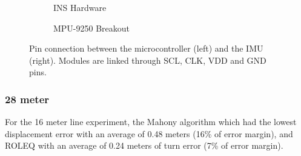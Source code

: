 \begin{figure}[!h]
    \centering
    \begin{subfigure}{0.49\textwidth}
        \centering
        \resizebox{1\linewidth}{!}{}
        \caption{INS Hardware}
        \label{fig:square162D}
    \end{subfigure}
    \begin{subfigure}{0.49\textwidth}
        \centering
        \resizebox{1\linewidth}{!}{}
        \caption{MPU-9250 Breakout}
        \label{fig:square163D}
    \end{subfigure}
    \caption{Pin connection between the microcontroller (left) and the IMU (right). Modules are linked through SCL, CLK, VDD and GND pins.}
    \label{fig:square16}
\end{figure}

\subsubsection{28 meter}

For the 16 meter line experiment, the Mahony algorithm which had the lowest displacement error with an average of 0.48 meters (16\% of error margin), and ROLEQ with an average of 0.24 meters of turn error (7\% of error margin).


\begin{figure}[!h]
    \centering
    
\end{figure}


